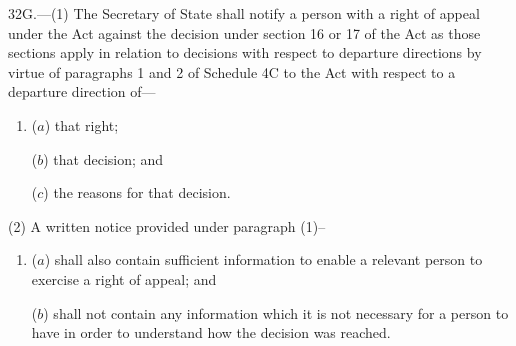 \documentclass[12pt,a4paper]{article}
\begin{document}
32G.—(1) The Secretary of State shall notify a person with a right of appeal under the Act against the decision under section 16 or 17 of the Act as those sections apply in relation to decisions with respect to departure directions by virtue of paragraphs 1 and 2 of Schedule 4C to the Act with respect to a departure direction of---
\begin{enumerate}\item[]
($a$) that right;

($b$) that decision; and

($c$) the reasons for that decision.
\end{enumerate}

(2) A written notice provided under paragraph (1)–
\begin{enumerate}\item[]
($a$) shall also contain sufficient information to enable a relevant person to exercise a right of appeal; and

($b$) shall not contain any information which it is not necessary for a person to have in order to understand how the decision was reached.
\end{enumerate}

\end{document}
